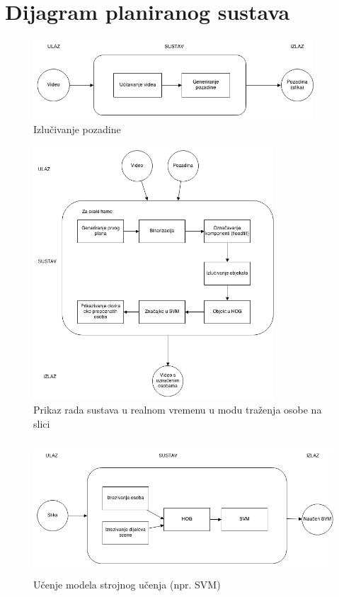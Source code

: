 \documentclass[times, utf8, seminar, numeric]{fer}
\begin{document}
\chapter{Dijagram planiranog sustava}

\begin{figure}[htb]
\centering
\includegraphics[height=3cm]{Dijagram1.png}
\caption{Izlučivanje pozadine}
\label{fig:sintaksno_stablo}
\end{figure}

\begin{figure}[htb]
\centering
\includegraphics[width=9cm]{Dijagram2.png}
\caption{Prikaz rada sustava u realnom vremenu u modu traženja osobe na slici}
\label{fig:sustav}
\end{figure}

\begin{figure}[htb]
\centering
\includegraphics[height=5cm]{Dijagram3.png}
\caption{Učenje modela strojnog učenja (npr. SVM)}
\label{fig:ucenje}
\end{figure}
\end{document}
